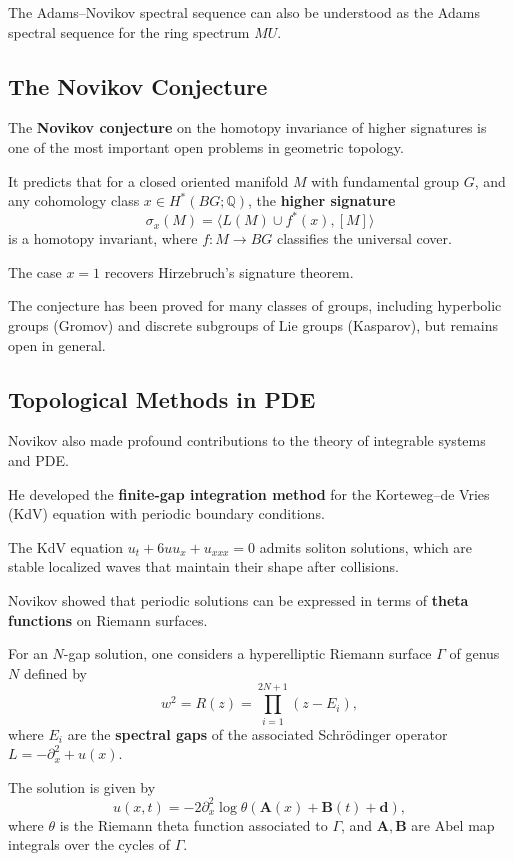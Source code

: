 The Adams--Novikov spectral sequence can also be understood as the Adams spectral sequence for the ring spectrum $MU$.

\subsection*{The Novikov Conjecture}

The \textbf{Novikov conjecture} on the homotopy invariance of higher signatures is one of the most important open problems in geometric topology.

It predicts that for a closed oriented manifold $M$ with fundamental group $G$, and any cohomology class $x \in H^*(BG; \mathbb{Q})$, the \textbf{higher signature}
\[
\sigma_x(M) = \langle L(M) \cup f^*(x), [M] \rangle
\]
is a homotopy invariant, where $f: M \to BG$ classifies the universal cover.

The case $x = 1$ recovers Hirzebruch's signature theorem.

The conjecture has been proved for many classes of groups, including hyperbolic groups (Gromov) and discrete subgroups of Lie groups (Kasparov), but remains open in general.

\subsection*{Topological Methods in PDE}

Novikov also made profound contributions to the theory of integrable systems and PDE.

He developed the \textbf{finite-gap integration method} for the Korteweg--de Vries (KdV) equation with periodic boundary conditions.

The KdV equation $u_t + 6uu_x + u_{xxx} = 0$ admits soliton solutions, which are stable localized waves that maintain their shape after collisions.

Novikov showed that periodic solutions can be expressed in terms of \textbf{theta functions} on Riemann surfaces.

For an $N$-gap solution, one considers a hyperelliptic Riemann surface $\Gamma$ of genus $N$ defined by
\[
w^2 = R(z) = \prod_{i=1}^{2N+1}(z - E_i),
\]
where $E_i$ are the \textbf{spectral gaps} of the associated Schrödinger operator $L = -\partial_x^2 + u(x)$.

The solution is given by
\[
u(x,t) = -2\partial_x^2 \log \theta(\mathbf{A}(x) + \mathbf{B}(t) + \mathbf{d}),
\]
where $\theta$ is the Riemann theta function associated to $\Gamma$, and $\mathbf{A}, \mathbf{B}$ are Abel map integrals over the cycles of $\Gamma$.

